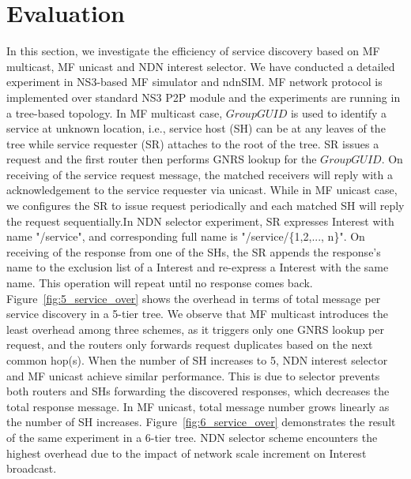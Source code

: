 \section{Evaluation}
In this section, we investigate the efficiency of service discovery based on MF multicast, MF unicast and NDN interest selector. We have conducted a detailed experiment in NS3-based MF simulator and ndnSIM.  MF network protocol is implemented over standard NS3 P2P module and the experiments are running in a tree-based topology. In MF multicast case, $Group GUID$ is used to identify a service at unknown location, i.e., service host (SH) can be at any leaves of the tree while service requester (SR) attaches to the root of the tree. SR issues a request and the first router then performs  GNRS lookup for the $Group GUID$. On receiving of the service request message, the matched receivers will reply with a acknowledgement to the service requester via unicast. While in MF unicast case, we configures the SR to issue request periodically and each matched SH will reply the request sequentially.In NDN selector experiment,  SR expresses Interest with name "/service", and corresponding full name is "/service/\{1,2,..., n\}". On receiving of the response from one of the SHs, the SR appends the response's name to the exclusion list of a Interest and re-express a Interest with the same name. This operation will repeat until no response comes back. Figure~\ref{fig:5_service_over} shows the overhead in terms of total message per service discovery in a 5-tier tree. We observe that MF multicast introduces the least overhead among three schemes, as it triggers only one GNRS lookup per request, and the routers only forwards request duplicates based on the next common hop(s). When the number of  SH increases to 5, NDN interest selector and MF unicast achieve similar performance. This is due to selector prevents  both routers and SHs forwarding the discovered responses, which decreases the total response message. In MF unicast, total message number grows linearly as the number of SH increases. Figure~\ref{fig:6_service_over} demonstrates the result of the same experiment in a 6-tier tree. NDN selector scheme encounters the highest overhead due to the impact of network scale increment on Interest broadcast. 
     
